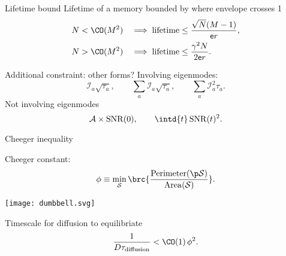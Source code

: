 \documentclass{beamer}%
\DeclareMathOperator{\snr}{SNR}
\newcommand{\initial}{\mathcal{I}}
\newcommand{\area}{\mathcal{A}}
\newcommand{\CS}{\mathcal{S}}
\renewcommand{\e}{\mathsf{e}}
\begin{document}

\begin{frame}{Lifetime bound}
%
 Lifetime of a memory bounded by where envelope crosses 1
 \begin{equation*}
 \begin{aligned}
   N &< \CO(M^2) &\implies
   \text{lifetime} &\leq \frac{\sqrt{N}(M-1)}{\e r}, \\
   N &> \CO(M^2) &\implies
   \text{lifetime} &\leq \frac{\gamma^2{N}}{2\e r}.
 \end{aligned}
 \end{equation*}
%
\end{frame}


\begin{frame}{Additional constraint: other forms?}
%
 Involving eigenmodes:
 \begin{equation*}
   \initial_a \sqrt{\tau_a},
   \qquad
   \sum_a \initial_a \sqrt{\tau_a},
   \qquad
   \sum_a \initial_a^2 {\tau_a}.
 \end{equation*}
 Not involving eigenmodes
 \begin{equation*}
   \area \times \snr(0),
   \qquad
   \intd{t} \snr(t)^2.
 \end{equation*}
%
\end{frame}


\begin{frame}{Cheeger inequality}
%
 \parbox{5cm}{
 Cheeger constant:
 \begin{equation*}
   \phi \equiv \min_\CS \brc{\frac{\operatorname{Perimeter}(\p\CS)}{\operatorname{Area}(\CS)}}.
 \end{equation*}
 }
 \parbox{6cm}{
   \texttt{[image: dumbbell.svg]}
 }
 Timescale for diffusion to equilibriate
 \begin{equation*}
   \frac{1}{D \tau_{\text{diffusion}}} < \CO(1)\, \phi^2.
 \end{equation*}
%
\end{frame}
\end{document}

